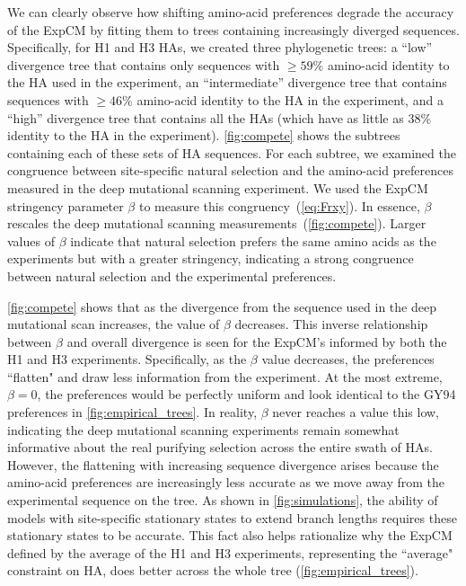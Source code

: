 \documentclass[11pt]{article}
\begin{document}
We can clearly observe how shifting amino-acid preferences degrade the accuracy of the ExpCM by fitting them to trees containing increasingly diverged sequences.
Specifically, for H1 and H3 HAs, we created three phylogenetic trees: a ``low'' divergence tree that contains only sequences with $\ge 59\%$ amino-acid identity to the HA used in the experiment, an ``intermediate'' divergence tree that contains sequences with $\ge 46\%$ amino-acid identity to the HA in the experiment, and a ``high'' divergence tree that contains all the HAs (which have as little as 38\% identity to the HA in the experiment).
\ref{fig:compete} shows the subtrees containing each of these sets of HA sequences.
For each subtree, we examined the congruence between site-specific natural selection and the amino-acid preferences measured in the deep mutational scanning experiment. 
We used the ExpCM stringency parameter $\beta$ to measure this congruency~(\ref{eq:Frxy}). 
In essence, $\beta$ rescales the deep mutational scanning measurements~(\ref{fig:compete}). 
Larger values of $\beta$ indicate that natural selection prefers the same amino acids as the experiments but with a greater stringency, indicating a strong congruence between natural selection and the experimental preferences. 

\ref{fig:compete} shows that as the divergence from the sequence used in the deep mutational scan increases, the value of $\beta$ decreases. 
This inverse relationship between $\beta$ and overall divergence is seen for the ExpCM's informed by both the H1 and H3 experiments.
Specifically, as the $\beta$ value decreases, the preferences ``flatten" and draw less information from the experiment. 
At the most extreme, $\beta = 0$, the preferences would be perfectly uniform and look identical to the GY94 preferences in \ref{fig:empirical_trees}.
In reality, $\beta$ never reaches a value this low, indicating the deep mutational scanning experiments remain somewhat informative about the real purifying selection across the entire swath of HAs. 
However, the flattening with increasing sequence divergence arises because the amino-acid preferences are increasingly less accurate as we move away from the experimental sequence on the tree.
As shown in \ref{fig:simulations}, the ability of models with site-specific stationary states to extend branch lengths requires these stationary states to be accurate.
This fact also helps rationalize why the ExpCM defined by the average of the H1 and H3 experiments, representing the ``average" constraint on HA, does better across the whole tree (\ref{fig:empirical_trees}). 
 
\end{document}
